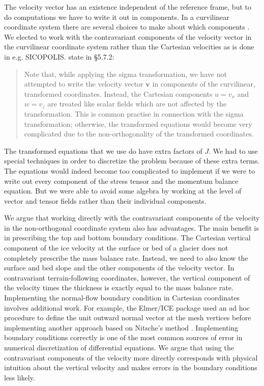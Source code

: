 \documentclass[gmd, manuscript]{copernicus}
\begin{document}
The velocity vector has an existence independent of the reference frame, but to do computations we have to write it out in components.
In a curvilinear coordinate system there are several choices to make about which components \citep{yang1994general}.
We elected to work with the contravariant components of the velocity vector in the curvilinear coordinate system rather than the Cartesian velocities as is done in e.g. SICOPOLIS.
\citet{greve2009dynamics} state in \S5.7.2:
\begin{quote}
    Note that, while applying the sigma transformation, we have not attempted to write the velocity vector $\mathbf v$ in components of the curvilinear, transformed coordinates.
    Instead, the Cartesian components $u = v_x$ and $w = v_z$ are treated like scalar fields which are not affected by the transformation.
    This is common practise in connection with the sigma transformation; otherwise, the transformed equations would become very complicated due to the non-orthogonality of the transformed coordinates.
\end{quote}
The transformed equations that we use do have extra factors of $J$.
We had to use special techniques in order to discretize the problem because of these extra terms.
The equations would indeed become too complicated to implement if we were to write out every component of the stress tensor and the momentum balance equation.
But we were able to avoid some algebra by working at the level of vector and tensor fields rather than their individual components.

We argue that working directly with the contravariant components of the velocity in the non-orthogonal coordinate system also has advantages.
The main benefit is in prescribing the top and bottom boundary conditions.
The Cartesian vertical component of the ice velocity at the surface or bed of a glacier does not completely prescribe the mass balance rate.
Instead, we need to also know the surface and bed slope and the other components of the velocity vector.
In contravariant terrain-following coordinates, however, the vertical component of the velocity times the thickness is exactly equal to the mass balance rate.
Implementing the normal-flow boundary condition in Cartesian coordinates involves additional work.
For example, the Elmer/ICE package used an ad hoc procedure to define the unit outward normal vector at the mesh vertices \citep{gagliardini2013capabilities} before implementing another approach based on Nitsche's method \citep{cheng2020full}.
Implementing boundary conditions correctly is one of the most common sources of error in numerical discretization of differential equations.
We argue that using the contravariant components of the velocity more directly corresponds with physical intuition about the vertical velocity and makes errors in the boundary conditions less likely.
\end{document}

